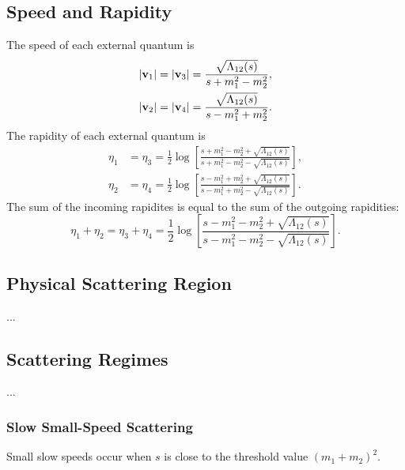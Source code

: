 \subsection{Speed and Rapidity}
The speed of each external quantum is
\begin{align}
	\left\lvert \mathbf{v}_{1} \right\rvert &= \left\lvert \mathbf{v}_{3} \right\rvert = \frac{\sqrt{\Lambda_{12}(s)}}{s + m_{1}^{2} - m_{2}^{2}}, \\
	\left\lvert \mathbf{v}_{2} \right\rvert &= \left\lvert \mathbf{v}_{4} \right\rvert = \frac{\sqrt{\Lambda_{12}(s)}}{s - m_{1}^{2} + m_{2}^{2}}.
\end{align}
The rapidity of each external quantum is
\begin{align}
	\eta_{1} &= \eta_{3} = \frac{1}{2} \log{\left[\frac{s + m_{1}^{2} - m_{2}^{2} + \sqrt{\Lambda_{12}(s)}}{s + m_{1}^{2} - m_{2}^{2} - \sqrt{\Lambda_{12}(s)}}\right]}, \\
	\eta_{2} &= \eta_{4} = \frac{1}{2} \log{\left[\frac{s - m_{1}^{2} + m_{2}^{2} + \sqrt{\Lambda_{12}(s)}}{s - m_{1}^{2} + m_{2}^{2} - \sqrt{\Lambda_{12}(s)}}\right]}.
\end{align}
The sum of the incoming rapidites is equal to the sum of the outgoing rapidities:
\begin{equation}
	\eta_{1} + \eta_{2} = \eta_{3} + \eta_{4} = \frac{1}{2} \log{\left[ \frac{s - m_{1}^{2} - m_{2}^{2} + \sqrt{\Lambda_{12}(s)}}{s - m_{1}^{2} - m_{2}^{2} - \sqrt{\Lambda_{12}(s)}} \right]}.
\end{equation}
\subsection{Physical Scattering Region}
...
\subsection{Scattering Regimes}
...
\subsubsection{Slow Small-Speed Scattering}
Small slow speeds occur when $s$ is close to the threshold value $(m_{1} + m_{2})^{2}$.
